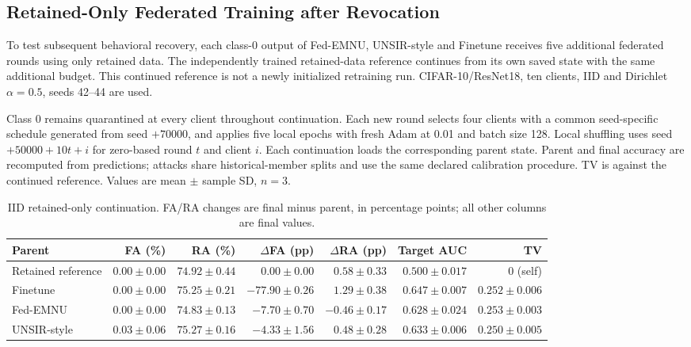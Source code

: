 \subsection{Retained-Only Federated Training after Revocation}

\label{sec:continuation}

To test subsequent behavioral recovery, each class-0 output of Fed-EMNU, UNSIR-style and Finetune receives five additional federated rounds using only retained data. The independently trained retained-data reference continues from its own saved state with the same additional budget. This continued reference is not a newly initialized retraining run. CIFAR-10/ResNet18, ten clients, IID and Dirichlet $\alpha=0.5$, seeds 42--44 are used.

Class 0 remains quarantined at every client throughout continuation. Each new round selects four clients with a common seed-specific schedule generated from seed $+70000$, and applies five local epochs with fresh Adam at 0.01 and batch size 128. Local shuffling uses seed $+50000+10t+i$ for zero-based round $t$ and client $i$. Each continuation loads the corresponding parent state. Parent and final accuracy are recomputed from predictions; attacks share historical-member splits and use the same declared calibration procedure. TV is against the continued reference. Values are mean $\pm$ sample SD, $n=3$.

\begin{table}[H]\centering\scriptsize\setlength{\tabcolsep}{3pt}

\caption{IID retained-only continuation. FA/RA changes are final minus parent, in percentage points; all other columns are final values.}

\label{tab:continuation-iid}

\begin{tabular}{lrrrrrr}\toprule Parent & FA (\%) & RA (\%) & $\Delta$FA (pp) & $\Delta$RA (pp) & Target AUC & TV\\\midrule

Retained reference & $0.00 \pm 0.00$ & $74.92 \pm 0.44$ & $0.00 \pm 0.00$ & $0.58 \pm 0.33$ & $0.500 \pm 0.017$ & 0 (self)\\

Finetune & $0.00 \pm 0.00$ & $75.25 \pm 0.21$ & $-77.90 \pm 0.26$ & $1.29 \pm 0.38$ & $0.647 \pm 0.007$ & $0.252 \pm 0.006$\\

Fed-EMNU & $0.00 \pm 0.00$ & $74.83 \pm 0.13$ & $-7.70 \pm 0.70$ & $-0.46 \pm 0.17$ & $0.628 \pm 0.024$ & $0.253 \pm 0.003$\\

UNSIR-style & $0.03 \pm 0.06$ & $75.27 \pm 0.16$ & $-4.33 \pm 1.56$ & $0.48 \pm 0.28$ & $0.633 \pm 0.006$ & $0.250 \pm 0.005$\\

\bottomrule\end{tabular}\end{table}

